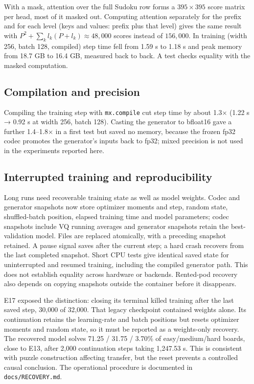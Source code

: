 \documentclass[
  british,
]{article}
\begin{document}
With a mask, attention over the full Sudoku row forms a
\(395 \times 395\) score matrix per head, most of it masked out.
Computing attention separately for the prefix and for each level (keys
and values: prefix plus that level) gives the same result with
\(P^2 + \sum_k l_k (P + l_k) \approx 48{,}000\) scores instead of
\(156{,}000\). In training (width 256, batch 128, compiled) step time
fell from 1.59 s to 1.18 s and peak memory from 18.7 GB to 16.4 GB,
measured back to back. A test checks equality with the masked
computation.

\subsection{Compilation and precision}\label{compilation-and-precision}

Compiling the training step with \texttt{mx.compile} cut step time by
about 1.3× (1.22 s → 0.92 s at width 256, batch 128). Casting the
generator to bfloat16 gave a further 1.4--1.8× in a first test but saved
no memory, because the frozen fp32 codec promotes the generator's inputs
back to fp32; mixed precision is not used in the experiments reported
here.

\subsection{Interrupted training and
reproducibility}\label{interrupted-training-and-reproducibility}

Long runs need recoverable training state as well as model weights.
Codec and generator snapshots now store optimizer moments and step,
random state, shuffled-batch position, elapsed training time and model
parameters; codec snapshots include VQ running averages and generator
snapshots retain the best-validation model. Files are replaced
atomically, with a preceding snapshot retained. A pause signal saves
after the current step; a hard crash recovers from the last completed
snapshot. Short CPU tests give identical saved state for uninterrupted
and resumed training, including the compiled generator path. This does
not establish equality across hardware or backends. Rented-pod recovery
also depends on copying snapshots outside the container before it
disappears.

E17 exposed the distinction: closing its terminal killed training after
the last saved step, 30,000 of 32,000. That legacy checkpoint contained
weights alone. Its continuation retains the learning-rate and batch
positions but resets optimizer moments and random state, so it must be
reported as a weights-only recovery. The recovered model solves 71.25 /
31.75 / 3.70\% of easy/medium/hard boards, close to E13, after 2,000
continuation steps taking 1,247.53 s. This is consistent with puzzle
construction affecting transfer, but the reset prevents a controlled
causal conclusion. The operational procedure is documented in
\texttt{docs/RECOVERY.md}.
\end{document}
